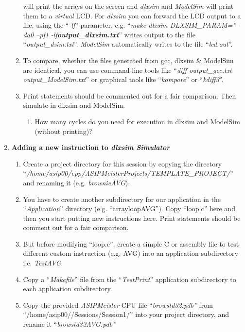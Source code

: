 \begin{enumerate}
\begin{enumerate}
		will print the arrays on the screen and \emph{dlxsim} and
		\emph{ModelSim} will print them to a \emph{virtual} LCD. For
		\emph{dlxsim} you can forward the LCD output to a file, using the
		``\emph{-lf}'' parameter, e.g. ``\emph{make dlxsim
			DLXSIM\_PARAM=''-da0 --pf1 -lf\textbf{output\_dlxsim.txt}}'' writes
		output to the file ``\emph{output\_dsim.txt}''. \emph{ModelSim}
		automatically writes to the file ``\emph{lcd.out}''.
		\item
		To compare, whether the files generated from gcc, dlxsim \& ModelSim
		are identical, you can use command-line tools like ``\emph{diff
			output\_gcc.txt output\_ModelSim.txt}'' or graphical tools like
		``\emph{kompare}'' or ``\emph{kdiff3}''.
		\item
		Print statements should be commented out for a fair comparison. Then
		simulate in dlxsim and ModelSim.
		\begin{enumerate}[label=(\alph*)]
			\color{red}\item\normalcolor
			How many cycles do you need for execution in dlxsim and ModelSim
			(without printing)?
		\end{enumerate}
	\end{enumerate}
\item \textbf{Adding a new instruction to \emph{dlxsim Simulator}}
	\begin{enumerate}
		\def\labelenumii{\arabic{enumii}.}
		\item
		Create a project directory for this session by copying the directory
		``\emph{/home/asip00/­epp/ASIP­Meister­Projects/TEMPLATE\_PROJECT/}''
		and renaming it (e.g. \emph{brownieAVG}).
		\item
		You have to create another subdirectory for our application in the
		``\emph{Application}'' directory (e.g. ``arrayloopAVG''). Copy
		``loop.c'' here and then you start putting new instructions here.
		Print statements should be comment out for a fair comparison.
		\item
		But before modifying ``loop.c'', create a simple C or assembly file
		to test different custom instruction (e.g. AVG) into an application
		subdirectory i.e. \emph{TestAVG}.
		\item
		Copy a ``\emph{Makefile}'' file from the ``\emph{TestPrint}''
		application subdirectory to each application subdirectory.
		\item
		Copy the provided \emph{ASIPMeister} CPU file
		``\emph{browstd32.pdb''} from ``/home/asip00//Sessions/Session1/''
		into your project directory, and rename it
		``\emph{browstd32AVG.pdb''}

\end{enumerate}
\end{enumerate}
